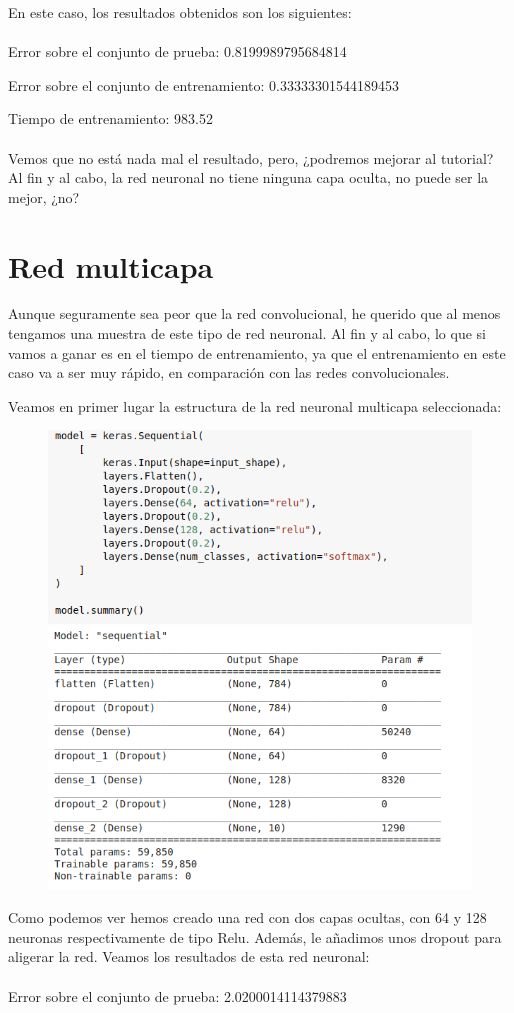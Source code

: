 En este caso, los resultados obtenidos son los siguientes:
\\\\
Error sobre el conjunto de prueba: 0.8199989795684814

Error sobre el conjunto de entrenamiento: 0.33333301544189453

Tiempo de entrenamiento: 983.52
\\\\
Vemos que no está nada mal el resultado, pero, ¿podremos mejorar al tutorial? Al fin y al cabo, la red neuronal no tiene ninguna capa oculta, no puede ser la mejor, ¿no?

\section{Red multicapa}

Aunque seguramente sea peor que la red convolucional, he querido que al menos tengamos una muestra de este tipo de red neuronal. Al fin y al cabo, lo que si vamos a ganar es en el tiempo de entrenamiento, ya que el entrenamiento en este caso va a ser muy rápido, en comparación con las redes convolucionales.

Veamos en primer lugar la estructura de la red neuronal multicapa seleccionada:

\begin{figure}[H]
	\centering
	\includegraphics[width=0.7\linewidth]{multicapa}
	\label{fig:multicapa}
\end{figure}

Como podemos ver hemos creado una red con dos capas ocultas, con 64 y 128 neuronas respectivamente de tipo Relu. Además, le añadimos unos dropout para aligerar la red. Veamos los resultados de esta red neuronal:
\\\\
Error sobre el conjunto de prueba: 2.0200014114379883

